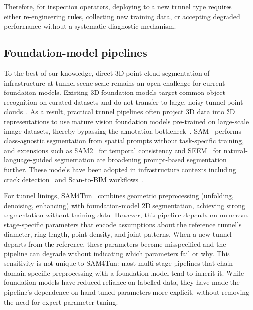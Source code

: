 \documentclass[a4paper,fleqn]{cas-dc}
\begin{document}
{Therefore, for inspection operators, deploying to a new tunnel type requires either re-engineering rules, collecting new training data, or accepting degraded performance without a systematic diagnostic mechanism.

\subsection{Foundation-model pipelines}

To the best of our knowledge, direct 3D point-cloud segmentation of infrastructure at tunnel scene scale remains an open challenge for current foundation models. Existing 3D foundation models target common object recognition on curated datasets and do not transfer to large, noisy tunnel point clouds~\cite{camuffo2022recent, liu2023openshape, guo2023pointbind, xu2024pointllm}. As a result, practical tunnel pipelines often project 3D data into 2D representations to use mature vision foundation models pre-trained on large-scale image datasets, thereby bypassing the annotation bottleneck~\cite{caron2021dino, franceschelli2024training}. SAM~\cite{kirillov2023sam} performs class-agnostic segmentation from spatial prompts without task-specific training, and extensions such as SAM2~\cite{ravi2024sam2} for temporal consistency and SEEM~\cite{zou2023segment} for natural-language-guided segmentation are broadening prompt-based segmentation further. These models have been adopted in infrastructure contexts including crack detection~\cite{ge2024cracksam,ye2024sam} and Scan-to-BIM workflows~\cite{wang2024omni, pan2024zero,ye2026maintenance}.

For tunnel linings, SAM4Tun~\cite{ye2025sam4tun} combines geometric preprocessing (unfolding, denoising, enhancing) with foundation-model 2D segmentation, achieving strong segmentation without training data. However, this pipeline depends on numerous stage-specific parameters that encode assumptions about the reference tunnel's diameter, ring length, point density, and joint patterns. When a new tunnel departs from the reference, these parameters become misspecified and the pipeline can degrade without indicating which parameters fail or why. This sensitivity is not unique to SAM4Tun: most multi-stage pipelines that chain domain-specific preprocessing with a foundation model tend to inherit it. While foundation models have reduced reliance on labelled data, they have made the pipeline's dependence on hand-tuned parameters more explicit, without removing the need for expert parameter tuning.

}
\end{document}

